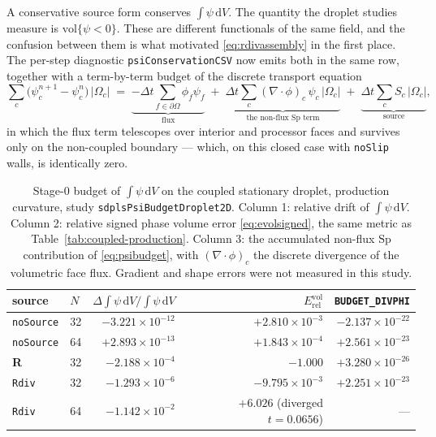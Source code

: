 \documentclass[preprint,3p,11pt]{elsarticle}
\newcommand{\psilev}{\psi}
\begin{document}
A conservative source form conserves $\int\psilev\,\mathrm dV$. The quantity the
droplet studies measure is $\mathrm{vol}\{\psilev < 0\}$. These are different
functionals of the same field, and the confusion between them is what motivated
\eqref{eq:rdivassembly} in the first place. The per-step diagnostic
\texttt{psiConservationCSV} now emits both in the same row, together with a
term-by-term budget of the discrete transport equation
\begin{equation}
  \sum_c \bigl(\psilev^{n+1}_c - \psilev^{n}_c\bigr)\,|\Omega_c|
  \;=\; \underbrace{-\Delta t \!\!\sum_{f \in \partial\Omega}\!\! \phi_f\psilev_f}_{\text{flux}}
  \;+\; \underbrace{\Delta t \sum_c (\nabla\cdot\phi)_c\,\psilev_c\,|\Omega_c|}_{\text{the non-flux } \mathrm{Sp} \text{ term}}
  \;+\; \underbrace{\Delta t \sum_c S_c\,|\Omega_c|}_{\text{source}},
  \label{eq:psibudget}
\end{equation}
in which the flux term telescopes over interior and processor faces and survives
only on the non-coupled boundary --- which, on this closed case with
\texttt{noSlip} walls, is identically zero.

\begin{table}[htbp]
\centering
\caption{Stage-0 budget of $\int\psilev\,\mathrm dV$ on the coupled stationary
droplet, production curvature, study \texttt{sdplsPsiBudgetDroplet2D}. Column 1:
relative drift of $\int\psilev\,\mathrm dV$. Column 2: relative signed phase
volume error \eqref{eq:evolsigned}, the same metric as
Table~\ref{tab:coupled-production}. Column 3: the accumulated non-flux
$\mathrm{Sp}$ contribution of \eqref{eq:psibudget}, with
$(\nabla\cdot\phi)_c$ the discrete divergence of the volumetric face flux.
Gradient and shape errors were not measured in this study.}
\label{tab:psibudget}
\small
\begin{tabular}{llrrr}
\toprule
source & $N$ & $\Delta\!\int\!\psilev\,\mathrm dV / \!\int\!\psilev\,\mathrm dV$
       & $E^{\mathrm{vol}}_{\mathrm{rel}}$ & \texttt{BUDGET\_DIVPHI} \\
\midrule
\texttt{noSource} & 32 & $-3.221\times10^{-12}$ & $+2.810\times10^{-3}$ & $-2.137\times10^{-22}$ \\
\texttt{noSource} & 64 & $+2.893\times10^{-13}$ & $+1.843\times10^{-4}$ & $+2.561\times10^{-23}$ \\
\textbf{R}        & 32 & $-2.188\times10^{-4}$  & $-1.000$              & $+3.280\times10^{-26}$ \\
\texttt{Rdiv}     & 32 & $-1.293\times10^{-6}$  & $-9.795\times10^{-3}$ & $+2.251\times10^{-23}$ \\
\texttt{Rdiv}     & 64 & $-1.142\times10^{-2}$  & $+6.026$ (diverged $t=0.0656$) & --- \\
\bottomrule
\end{tabular}
\end{table}
\end{document}
